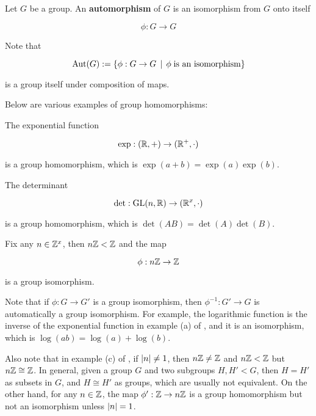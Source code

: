 \documentclass[a4paper,12pt]{article}
\begin{document}
\begin{dft}
  Let $G$ be a group. An \textbf{automorphism} of $G$ is an isomorphism from $G$ onto itself

  $$\phi:G\to G$$
\end{dft}\n

Note that

$$\textrm{Aut}(G):=\left\{ \phi:G\to G\,\mid\,\phi\;\text{is an isomorphism}\right\}$$\s

is a group itself under composition of maps.\n

\begin{exm}
  Below are various examples of group homomorphisms:

  \begin{alist}
    \item The exponential function

    $$\exp:(\mathbb{R},+)\to(\mathbb{R}^{+},\cdot)$$\s

    is a group homomorphism, which is $\exp(a+b)=\exp(a)\exp(b)$.
    \item The determinant

    $$\det:\mathrm{GL}(n,\mathbb{R})\to(\mathbb{R}^{x},\cdot)$$\s

    is a group homomorphism, which is $\det(AB)=\det(A)\det(B)$.
    \item Fix any $n\in\mathbb{Z}^{x}$, then $n\mathbb{Z}<\mathbb{Z}$ and the map

    $$\phi:n\mathbb{Z}\to\mathbb{Z}$$\s

    is a group isomorphism.
  \end{alist}
\end{exm}\n

Note that if $\phi:G\to G'$ is a group isomorphism, then $\phi^{-1}:G'\to G$ is automatically a group isomorphism. For example, the logarithmic function is the inverse of the exponential function in example (a) of \rexm[\sct], and it is an isomorphism, which is $\log(ab)=\log(a)+\log(b)$.\n

Also note that in example (c) of \rexm[\sct], if $\left| n\right|\neq 1$, then $n\mathbb{Z}\neq\mathbb{Z}$ and $n\mathbb{Z}<\mathbb{Z}$ but $n\mathbb{Z}\cong\mathbb{Z}$. In general, given a group $G$ and two subgroups $H,H'<G$, then $H=H'$ as subsets in $G$, and $H\cong H'$ as groups, which are usually not equivalent. On the other hand, for any $n\in\mathbb{Z}$, the map $\phi':\mathbb{Z}\to n\mathbb{Z}$ is a group homomorphism but not an isomorphism unless $\left| n\right|=1$.\n
\end{document}
